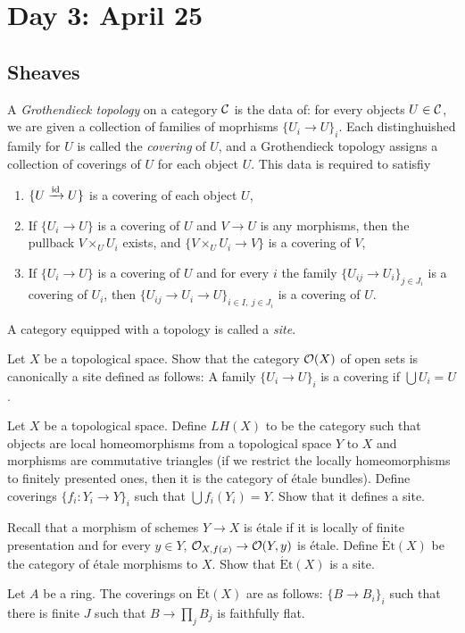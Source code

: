 \documentclass{../../../small}
\begin{document}
\newpage
\section{Day 3: April 25}

\subsection{Sheaves}


\begin{defn*}
A \emph{Grothendieck topology} on a category $\mathcal{C}$ is the data of: for every objects $U\in\mathcal{C}$, we are given a collection of families of moprhisms $\{U_i\to U\}_i$.
Each distinghuished family for $U$ is called the \emph{covering} of $U$, and a Grothendieck topology assigns a collection of coverings of $U$ for each object $U$.
This data is required to satisfiy
\begin{enumerate}
\item $\{U\xrightarrow{\operatorname{id}}U\}$ is a covering of each object $U$,
\item If $\{U_i\to U\}$ is a covering of $U$ and $V\to U$ is any morphisms, then the pullback $V\times_UU_i$ exists, and $\{V\times_UU_i\to V\}$ is a covering of $V$,
\item If $\{U_i\to U\}$ is a covering of $U$ and for every $i$ the family $\{U_{ij}\to U_i\}_{j\in J_i}$ is a covering of $U_i$, then $\{U_{ij}\to U_i\to U\}_{i\in I,\ j\in J_i}$ is a covering of $U$.
\end{enumerate}
A category equipped with a topology is called a \emph{site}.
\end{defn*}

\begin{exe*}
Let $X$ be a topological space.
Show that the category $\mathcal{O}(X)$ of open sets is canonically a site defined as follows:
A family $\{U_i\to U\}_i$ is a covering if $\bigcup U_i=U$.
\end{exe*}
\begin{exe*}
Let $X$ be a topological space.
Define $LH(X)$ to be the category such that objects are local homeomorphisms from a topological space $Y$ to $X$ and morphisms are commutative triangles (if we restrict the locally homeomorphisms to finitely presented ones, then it is the category of \'etale bundles).
Define coverings $\{f_i:Y_i\to Y\}_i$ such that $\bigcup f_i(Y_i)=Y$.
Show that it defines a site.
\end{exe*}
\begin{exe*}
Recall that a morphism of schemes $Y\to X$ is \'etale if it is locally of finite presentation and for every $y\in Y$, $\mathcal{O}_{X,f(x)}\to\mathcal{O}(Y,y)$ is \'etale.
Define $\mathrm{\acute Et}(X)$ be the category of \'etale morphisms to $X$.
Show that $\mathrm{\acute Et}(X)$ is a site.
\end{exe*}
\begin{exe*}
Let $A$ be a ring.
The coverings on $\mathrm{\acute Et}(X)$ are as follows: $\{B\to B_i\}_i$ such that there is finite $J$ such that $B\to\prod_jB_j$ is faithfully flat.
\end{exe*}
\end{document}
